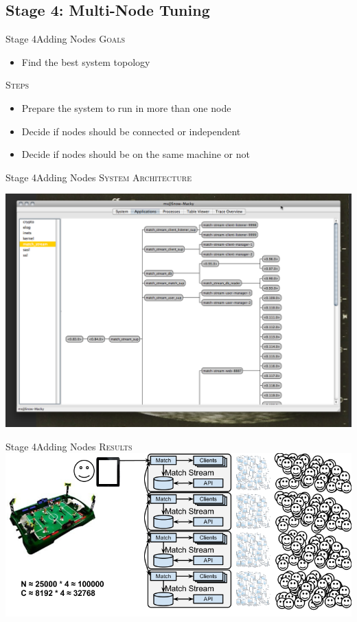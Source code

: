 \documentclass[utf8]{beamer}
\begin{document}
\subsection{Stage 4: Multi-Node Tuning}
\begin{frame}{Stage 4}{Adding Nodes}
	\textsc{Goals}
	\begin{itemize}
		\item Find the best system topology
	\end{itemize}
	\pause
	\textsc{Steps}
	\begin{itemize}
		\item Prepare the system to run in more than one node
		\item Decide if nodes should be connected or independent
		\item Decide if nodes should be on the same machine or not
	\end{itemize}
\end{frame}
\begin{frame}{Stage 4}{Adding Nodes}
	\textsc{System Architecture}
	\begin{center}
		\includegraphics[height=.75\textheight]{img/running-late.png}
	\end{center}
\end{frame}
\begin{frame}{Stage 4}{Adding Nodes}
	\textsc{Results}
	\includegraphics[top=-1,width=\textwidth]{img/MatchStream-4.png}
\end{frame}
\end{document}

